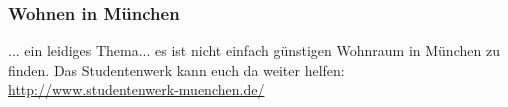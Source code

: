 \subsubsection{Wohnen in München}
... ein leidiges Thema... es ist nicht einfach günstigen Wohnraum in 
München zu finden. Das Studentenwerk kann euch da weiter helfen: \doublebreak
\url{http://www.studentenwerk-muenchen.de/} 
